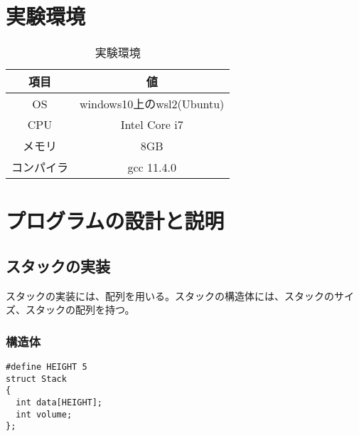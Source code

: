 \documentclass[a4paper,11pt]{jsarticle}
\begin{document}
\section{実験環境}
\begin{table}[ht]
  \centering
  \begin{tabular}{|c|c|}
    \hline
    \textbf{項目} & \textbf{値}              \\
    \hline
    OS          & windows10上のwsl2(Ubuntu) \\
    \hline
    CPU         & Intel Core i7           \\
    \hline
    メモリ         & 8GB                     \\
    \hline
    コンパイラ       & gcc 11.4.0              \\
    \hline
  \end{tabular}
  \caption{実験環境}
  \label{tab:environment}
\end{table}

\section{プログラムの設計と説明}
\subsection{スタックの実装}
スタックの実装には、配列を用いる。スタックの構造体には、スタックのサイズ、スタックの配列を持つ。
\subsubsection{構造体}
\begin{lstlisting}[caption={stack.h}, label={lst:stackh}]
#define HEIGHT 5
struct Stack
{
  int data[HEIGHT];
  int volume;
};
\end{lstlisting}
\end{document}
